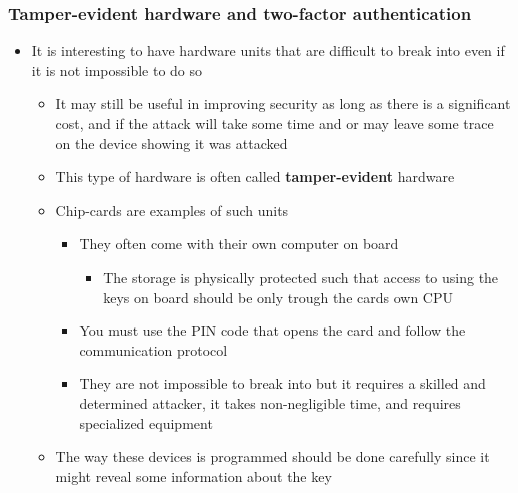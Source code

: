 \documentclass[11pt]{article}
\begin{document}
\subsubsection{Tamper-evident hardware and two-factor authentication}
\label{sec:org24c8174}
\begin{itemize}
\item It is interesting to have hardware units that are difficult to break into even if it is not impossible to do so
\begin{itemize}
\item It may still be useful in improving security as long as there is a significant cost, and if the attack will take some time and or may leave some trace on the device showing it was attacked
\item This type of hardware is often called \textbf{tamper-evident} hardware
\item Chip-cards are examples of such units
\begin{itemize}
\item They often come with their own computer on board
\begin{itemize}
\item The storage is physically protected such that access to using the keys on board should be only trough the cards own CPU
\end{itemize}
\item You must use the PIN code that opens the card and follow the communication protocol
\item They are not impossible to break into but it requires a skilled and determined attacker, it takes non-negligible time, and requires specialized equipment
\end{itemize}
\item The way these devices is programmed should be done carefully since it might reveal some information about the key
\end{itemize}


\end{itemize}
\end{document}
